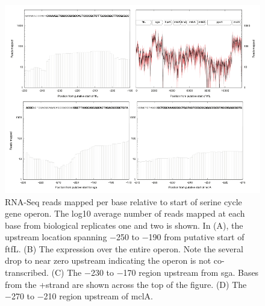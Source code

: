 \begin{figure}[H]
\centering
     \includegraphics[width=1.0\textwidth]{./tex/chapter1/figures/supplemental/FigureS4.png}
     \begin{singlespace}
     \caption[RNA-Seq reads mapped per base relative to start of serine cycle gene operon.]{
        RNA-Seq reads mapped per base relative to start of serine cycle gene operon.
        The log10 average number of reads mapped at each base from biological replicates one and two is shown.
        In (A), the upstream location spanning −250 to −190 from putative start of ftfL. (B) The expression over the entire operon.
        Note the several drop to near zero upstream indicating the operon is not co-transcribed. (C) The −230 to −170 region upstream from sga.
        Bases from the +strand are shown across the top of the figure. (D) The −270 to −210 region upstream of mclA.
        }
     \label{fig:S4}
     \end{singlespace}
\end{figure}


